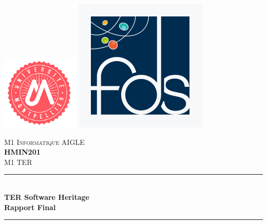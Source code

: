 \documentclass[12pt,a4paper]{report}
\begin{document}
\begin{titlepage}
\newcommand{\HRule}{\rule{\linewidth}{0.5mm}} %
\center

\includegraphics[scale=0.5]{images/umLogo.png} %
\hspace{\fill}
\includegraphics[scale=0.25]{images/fdsLogo.jpg} %

\textsc{\LARGE M1 Informatique AIGLE}\\[1cm]
\textsc{\Large \textbf{HMIN201}}\\[0.25cm]
\textsc{\large M1 TER}\\[0.5cm]

\HRule \\[0.4cm]
{ \huge \bfseries TER Software Heritage}\\[0.4cm]
{ \Large \bfseries Rapport Final}\\[0.4cm]
\HRule \\[0.5cm]


\end{titlepage}
\end{document}
